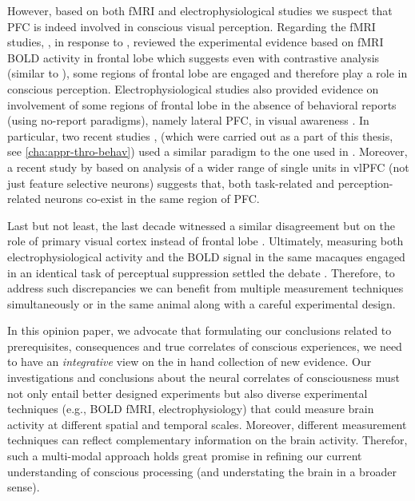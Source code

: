 However, based on both fMRI and electrophysiological studies we suspect that PFC is indeed involved in conscious visual perception.
Regarding the fMRI studies, \citet{zaretskayaIntrospectionAttentionAwareness2014}, in response to \citet{frassleBinocularRivalryFrontal2014},
reviewed the experimental evidence based on fMRI BOLD activity in frontal lobe which suggests even with contrastive analysis (similar to \citet{frassleBinocularRivalryFrontal2014}), some regions of frontal lobe are engaged and therefore play a role in conscious perception.
Electrophysiological studies  also provided evidence on involvement of some regions of frontal lobe in the absence of behavioral reports (\ie using no-report paradigms),
namely lateral PFC, in visual awareness \cite{panagiotaropoulosNeuronalDischargesGamma2012,kapoorDecodingInternallyGenerated2022,dwarakanathBistabilityPrefrontalStates2023}.
In particular, two recent studies  \cite{kapoorDecodingInternallyGenerated2022,dwarakanathBistabilityPrefrontalStates2023},
(which were carried out as a part of this thesis, see \autoref{cha:appr-thro-behav})
used a similar paradigm to the one used in \citet{frassleBinocularRivalryFrontal2014}.
Moreover, a recent study by \citet{kapoorParallelFunctionallySegregated2018}
based on analysis of a wider range of single units in vlPFC (not just feature selective neurons)
suggests that, both task-related and perception-related neurons co-exist in the same region of PFC.

Last but not least, the last decade witnessed a similar disagreement but on the role of primary visual cortex instead of frontal lobe
\cite{leopoldActivityChangesEarly1996,maierDivergenceFMRINeural2008a,kelirisRolePrimaryVisual2010,leopoldPrimaryVisualCortex2012}.
Ultimately, measuring both electrophysiological activity and the BOLD signal in the
same macaques engaged in an identical
task of perceptual suppression settled the debate \cite{maierDivergenceFMRINeural2008a,leopoldPrimaryVisualCortex2012}.
Therefore, to address such discrepancies we can benefit from multiple measurement techniques simultaneously or in the same animal along with a careful experimental design.

In this opinion paper, we advocate that 
formulating our conclusions related to prerequisites, consequences and true correlates of conscious experiences,
we need to have an \emph{integrative} view on the in hand collection of new evidence.
Our investigations and conclusions about the neural correlates of
consciousness must not only entail better designed experiments
but also diverse experimental techniques (e.g., BOLD fMRI, electrophysiology)
that could measure brain activity at different spatial
and temporal scales.
Moreover, different measurement techniques can reflect complementary information on the brain activity.
Therefor, such a multi-modal approach holds great promise in refining our current
understanding of conscious processing (and understating the brain in a broader sense).




